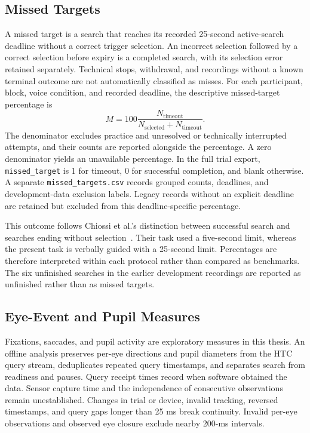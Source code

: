 \subsection{Missed Targets}
A missed target is a search that reaches its recorded 25-second active-search deadline without a correct trigger selection. An incorrect selection followed by a correct selection before expiry is a completed search, with its selection error retained separately. Technical stops, withdrawal, and recordings without a known terminal outcome are not automatically classified as misses. For each participant, block, voice condition, and recorded deadline, the descriptive missed-target percentage is
\begin{equation}
M=100\frac{N_{\mathrm{timeout}}}{N_{\mathrm{selected}}+N_{\mathrm{timeout}}}.
\end{equation}
The denominator excludes practice and unresolved or technically interrupted attempts, and their counts are reported alongside the percentage. A zero denominator yields an unavailable percentage. In the full trial export, \texttt{missed\_target} is 1 for timeout, 0 for successful completion, and blank otherwise. A separate \texttt{missed\_targets.csv} records grouped counts, deadlines, and development-data exclusion labels. Legacy records without an explicit deadline are retained but excluded from this deadline-specific percentage.

This outcome follows Chiossi et al.'s distinction between successful search and searches ending without selection~\cite{chiossi2024searching}. Their task used a five-second limit, whereas the present task is verbally guided with a 25-second limit. Percentages are therefore interpreted within each protocol rather than compared as benchmarks. The six unfinished searches in the earlier development recordings are reported as unfinished rather than as missed targets.

\subsection{Eye-Event and Pupil Measures}
Fixations, saccades, and pupil activity are exploratory measures in this thesis. An offline analysis preserves per-eye directions and pupil diameters from the HTC query stream, deduplicates repeated query timestamps, and separates search from readiness and pauses. Query receipt times record when software obtained the data. Sensor capture time and the independence of consecutive observations remain unestablished. Changes in trial or device, invalid tracking, reversed timestamps, and query gaps longer than 25 ms break continuity. Invalid per-eye observations and observed eye closure exclude nearby 200-ms intervals.


